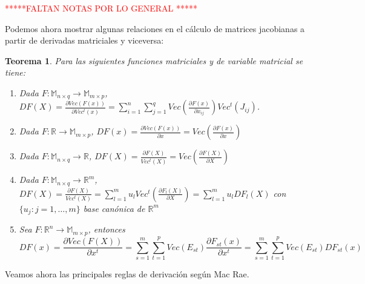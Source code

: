 \documentclass{article}
\theoremstyle{theorem-style}  %
\newtheorem{theorem}{Teorema}[section]  %
\theoremstyle{definition-style}
\theoremstyle{example-style}
\theoremstyle{exercise-style}
\begin{document}
	\textcolor{red}{*****FALTAN NOTAS POR LO GENERAL *****}
	
	Podemos ahora mostrar algunas relaciones en el cálculo de matrices jacobianas a partir de derivadas matriciales y viceversa:
	
	
	\begin{theorem}
		Para las siguientes funciones matriciales y de variable matricial se tiene:
		
		\begin{enumerate}
			\item Dada $F:\mathbb{M}_{n\times q} \rightarrow \mathbb{M}_{m \times p}$, $DF(X)=\frac{\partial Vec(F(x))}{\partial Vec^t(x)}=\sum_{i=1}^{n} \sum_{j=1}^{q} Vec(\frac{\partial F(x)}{\partial x_{ij}})Vec^t(J_{ij})$.
			
			\item Dada $F:\mathbb{R} \rightarrow \mathbb{M}_{m \times p}$, $DF(x)=\frac{\partial Vec(F(x))}{\partial x} = Vec(\frac{\partial F(x)}{\partial x})$ 
			
			\item Dada $F:\mathbb{M}_{n\times q} \rightarrow \mathbb{R}$, $DF(X)=\frac{\partial F(X)}{Vec^t(X)}=Vec(\frac{\partial F(X)}{\partial X})$
			
			\item  Dada $F:\mathbb{M}_{n\times q} \rightarrow \mathbb{R}^m$, $DF(X)=\frac{\partial F(X)}{Vec^t(X)} = \sum_{l=1}^{m} u_l Vec^t(\frac{\partial F_l(X)}{\partial X})=\sum_{l=1}^{m} u_l DF_l(X)$ con $\{u_j: j=1, \dots, m\}$ base canónica de $\mathbb{R}^m$
			
			\item Sea $F: \mathbb{R}^n \rightarrow \mathbb{M}_{m\times p} $, entonces 
			$$ DF(x)= \frac{\partial Vec(F(X))}{\partial x^t} = \sum_{s=1}^{m} \sum_{t=1}^{p} Vec(E_{st}) \frac{\partial F_{st}(x)}{\partial x^t} = \sum_{s=1}^{m} \sum_{t=1}^{p} Vec(E_{st}) DF_{st}(x)$$
			
			
		\end{enumerate}
	\end{theorem}
	
	Veamos ahora las principales reglas de derivación según Mac Rae.
	
\end{document}
